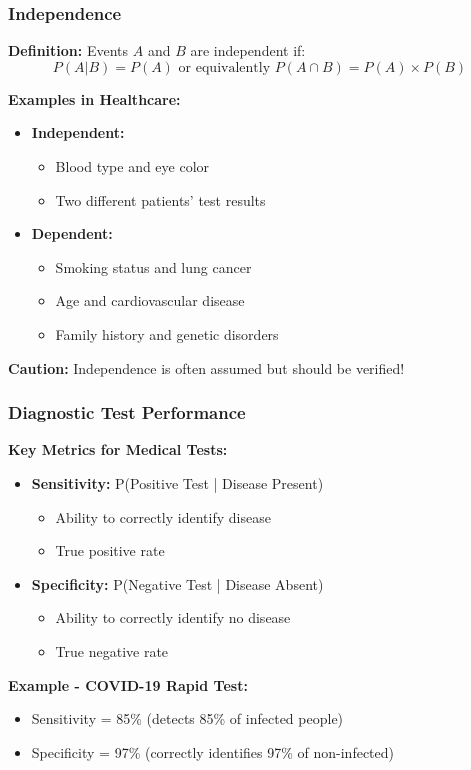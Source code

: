 \documentclass{beamer}
\begin{document}
\begin{frame}
\frametitle{Independence}
\textbf{Definition:} Events $A$ and $B$ are independent if:
$$P(A|B) = P(A) \text{ or equivalently } P(A \cap B) = P(A) \times P(B)$$

\vspace{0.5cm}
\textbf{Examples in Healthcare:}
\begin{itemize}
\item \textbf{Independent:}
  \begin{itemize}
  \item Blood type and eye color
  \item Two different patients' test results
  \end{itemize}
\item \textbf{Dependent:}
  \begin{itemize}
  \item Smoking status and lung cancer
  \item Age and cardiovascular disease
  \item Family history and genetic disorders
  \end{itemize}
\end{itemize}

\vspace{0.5cm}
\textbf{Caution:} Independence is often assumed but should be verified!
\end{frame}

\begin{frame}
\frametitle{Diagnostic Test Performance}
\textbf{Key Metrics for Medical Tests:}
\begin{itemize}
\item \textbf{Sensitivity:} P(Positive Test | Disease Present)
  \begin{itemize}
  \item Ability to correctly identify disease
  \item True positive rate
  \end{itemize}
\item \textbf{Specificity:} P(Negative Test | Disease Absent)
  \begin{itemize}
  \item Ability to correctly identify no disease
  \item True negative rate
  \end{itemize}
\end{itemize}

\vspace{0.5cm}
\textbf{Example - COVID-19 Rapid Test:}
\begin{itemize}
\item Sensitivity = 85\% (detects 85\% of infected people)
\item Specificity = 97\% (correctly identifies 97\% of non-infected)
\end{itemize}
\end{frame}
\end{document}
